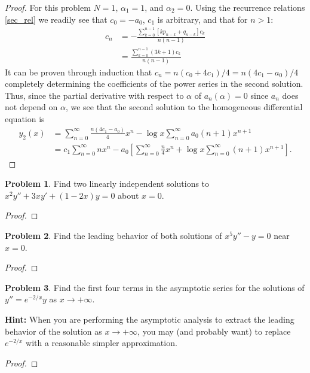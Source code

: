 \documentclass[12pt]{article}
\theoremstyle{definition}
\newtheorem{problem}{Problem}
\begin{document}
\begin{proof}
  For this problem $N=1$, $\alpha_1 = 1$, and $\alpha_2 = 0$. Using the recurrence relations \eqref{sec_rel} we readily see that
  $c_0 = -a_0$, $c_1$ is arbitrary, and that for $n>1$:
  \begin{align*}
    c_n &= -\frac{\sum_{k=0}^{n-1}[kp_{n-k}+q_{n-k}]c_k}{n(n-1)}\\
    &= \frac{\sum_{k=0}^{n-1}(3k+1)c_k}{n(n-1)}
  \end{align*}
  It can be proven through induction that $c_n = n(c_0 + 4c_1)/4 = n(4c_1 - a_0)/4$ completely determining the coefficients of the power series in the second solution.
  Thus, since the partial derivative with respect to $\alpha$ of $a_n(\alpha) = 0$ since $a_n$ does not depend on $\alpha$, we see that the second solution
  to the homogeneous differential equation is
  \begin{align*}
    y_2(x) &= \sum_{n=0}^\infty\frac{n(4c_1-a_0)}{4}x^n - \log x \sum_{n=0}^\infty a_0(n+1)x^{n+1} \\
    &= c_1\sum_{n=0}^\infty n x^n - a_0 \left[\sum_{n=0}^\infty \frac{n}{4} x^n+ \log x \sum_{n=0}^\infty (n+1)x^{n+1}\right].
  \end{align*}
\end{proof}
\newpage


\begin{problem}
  Find two linearly independent solutions to $x^2y'' + 3xy' + (1-2x)y = 0$ about $x=0$.
\end{problem}

\begin{proof}
\end{proof}
\newpage


\begin{problem}
  Find the leading behavior of both solutions of $x^5y'' - y = 0$ near $x=0$.
\end{problem}

\begin{proof}
\end{proof}
\newpage


\begin{problem}
  Find the first four terms in the asymptotic series for the solutions of $y'' = e^{-2/x}y$ as $x\to + \infty$.

  \textbf{Hint:} When you are performing the asymptotic analysis to extract the leading
  behavior of the solution as $x\to  + \infty$, you may (and probably want) to replace
  $e^{-2/x}$ with a reasonable simpler approximation.
\end{problem}

\begin{proof}
\end{proof}
\newpage
\end{document}
